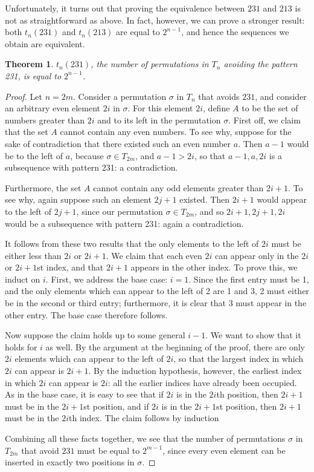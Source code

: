 \documentclass[11pt,letterpaper,twoside,english]{article}
\theoremstyle{theorem}
\newtheorem{theorem}{Theorem}[section]
\theoremstyle{remark}
\begin{document}
Unfortunately, it turns out that proving the equivalence between $231$ and $213$ is not as straightforward as above. In fact, however, we can prove a stronger result: both $t_n(231)$ and $t_n(213)$ are equal to $2^{n-1}$, and hence the sequences we obtain are equivalent.

\begin{theorem}
$t_n(231)$, the number of permutations in $T_n$ avoiding the pattern 231, is equal to $2^{n-1}$.
\end{theorem}

\begin{proof}
Let $n=2m$. Consider a permutation $\sigma$ in $T_{n}$ that avoids $231$, and consider an arbitrary even element $2i$ in $\sigma$. For this element $2i$, define $A$ to be the set of numbers greater than $2i$ and to its left in the permutation $\sigma$. First off, we claim that the set $A$ cannot contain any even numbers. To see why, suppose for the sake of contradiction that there existed such an even number $a$. Then $a-1$ would be to the left of $a$, because $\sigma\in T_{2m}$, and $a-1>2i$, so that $a-1, a, 2i$ is a subsequence with pattern 231: a contradiction.

Furthermore, the set $A$ cannot contain any odd elements greater than $2i+1$. To see why, again suppose such an element $2j+1$ existed. Then $2i+1$ would appear to the left of $2j+1$, since our permutation $\sigma\in T_{2m}$, and so $2i+1, 2j+1, 2i$ would be a subsequence with pattern 231: again a contradiction.

It follows from these two results that the only elements to the left of $2i$ must be either less than $2i$ or $2i+1$. We claim that each even $2i$ can appear only in the $2i$ or $2i+1$st index, and that $2i+1$ appears in the other index. To prove this, we induct on $i$. First, we address the base case: $i=1$. Since the first entry must be 1, and the only elements which can appear to the left of 2 are 1 and 3, 2 must either be in the second or third entry; furthermore, it is clear that 3 must appear in the other entry. The base case therefore follows.

Now suppose the claim holds up to some general $i-1$. We want to show that it holds for $i$ as well. By the argument at the beginning of the proof, there are only $2i$ elements which can appear to the left of $2i$, so that the largest index in which $2i$ can appear is $2i+1$. By the induction hypothesis, however, the earliest index in which $2i$ can appear is $2i$: all the earlier indices have already been occupied. As in the base case, it is easy to see that if $2i$ is in the $2i$th position, then $2i+1$ must be in the $2i+1$st position, and if $2i$ is in the $2i+1$st position, then $2i+1$ must be in the $2i$th index. The claim follows by induction

Combining all these facts together, we see that the number of permutations $\sigma$ in $T_{2m}$ that avoid $231$ must be equal to $ 2^{m-1}$, since every even element can be inserted in exactly two positions in $\sigma$.

\end{proof}
\end{document}
